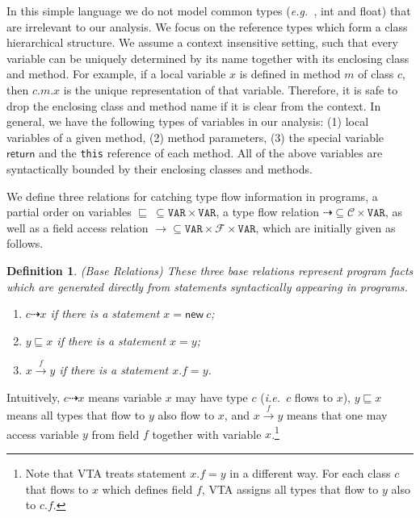 \documentclass{fac}
\newcommand\eg{\textit{e.g.\ }}
\newcommand\ie{\textit{i.e.\ }}
\newtheorem{Definition}{Definition}
\newcommand{\keyword}[1]{\mathsf{#1}}
\newcommand{\kwnew}[0]{\keyword{new}}
\newcommand\Var{\mathtt{VAR}}
\newcommand{\Class}{\mathcal{C}}
\newcommand{\Field}{\mathcal{F}}
\newcommand{\less}{\sqsubseteq}
\newcommand{\tflow}{\dashrightarrow}
\newcommand{\hflow}{\longrightarrow}
\newcommand{\lhflow}[1]{\stackrel{#1}{\hflow}}
\begin{document}
In this simple language we do not model common types (\eg, int and float) that are irrelevant to our analysis. We focus on the reference types which form a class hierarchical structure. We assume a context insensitive setting, such that every variable can be uniquely determined by its name together with its enclosing class and method.
For example, if a local variable $x$ is defined in method $m$ of class $c$, then $c.m.x$ is the unique representation of that variable. Therefore, it is safe to drop the enclosing class and method name if it is clear from the context.
In general, we have the following types of variables in our analysis: (1) local variables of a given method, (2) method parameters, (3) the special variable $\keyword{return}$ and the \texttt{this} reference of each method. All of the above variables are syntactically bounded by their enclosing classes and methods.

We define three relations for catching type flow information in programs, a partial order on variables $\less\ \subseteq\Var\times\Var$, a type flow relation
$\tflow\subseteq\Class\times\Var$, as well as a field access relation $\hflow\subseteq\Var\times\Field\times\Var$,
which are initially given as follows.

\begin{Definition}\label{def:base} (Base Relations)
These three base relations represent program facts which are generated directly %
from statements syntactically appearing in programs.
\begin{enumerate}
  \item $c\tflow x$ if there is a statement $x = \kwnew\ c$;
  \item $y\less x$ if there is a statement $x = y $;
  \item $x\lhflow{f}y$ if there is a statement $x.f = y$.
\end{enumerate}
\end{Definition}

Intuitively, $c\tflow x$ means variable $x$ may have type $c$ (\ie $c$ flows to $x$), $y\less x$ means all types that flow to $y$ also flow to $x$, and $x\lhflow{f}y$ means that one may access variable $y$ from field $f$ together with variable $x$.\footnote{Note that VTA treats statement $x.f = y$ in a different way. For each class $c$ that flows to $x$ which defines field $f$, VTA assigns all types that flow to $y$ also to $c.f$.}
\end{document}
